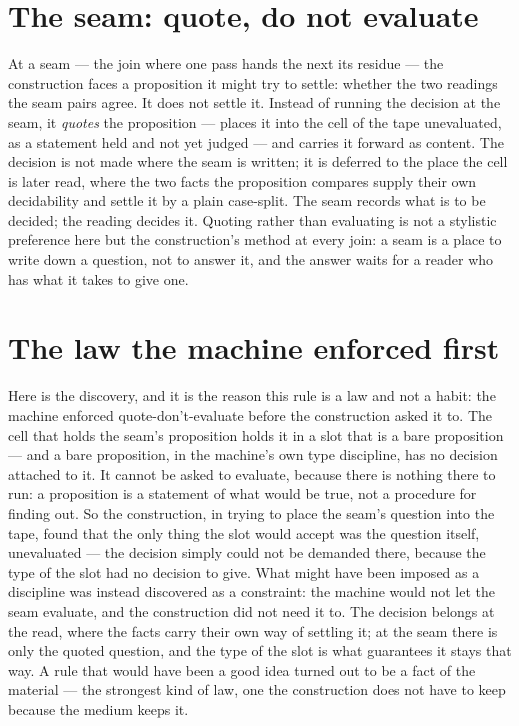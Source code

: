 \section{The seam: quote, do not evaluate}
\label{se:the-seam-quote-not-evaluate}

At a seam --- the join where one pass hands the next its residue --- the construction faces a proposition it
might try to settle: whether the two readings the seam pairs agree. It does not settle it. Instead of
running the decision at the seam, it \emph{quotes} the proposition --- places it into the cell of the tape
unevaluated, as a statement held and not yet judged --- and carries it forward as content. The decision is
not made where the seam is written; it is deferred to the place the cell is later read, where the two facts
the proposition compares supply their own decidability and settle it by a plain case-split. The seam records
what is to be decided; the reading decides it. Quoting rather than evaluating is not a stylistic preference
here but the construction's method at every join: a seam is a place to write down a question, not to answer
it, and the answer waits for a reader who has what it takes to give one.

\section{The law the machine enforced first}
\label{se:law-machine-enforced-first}

Here is the discovery, and it is the reason this rule is a law and not a habit: the machine enforced
quote-don't-evaluate before the construction asked it to. The cell that holds the seam's proposition holds
it in a slot that is a bare proposition --- and a bare proposition, in the machine's own type discipline,
has no decision attached to it. It cannot be asked to evaluate, because there is nothing there to run: a
proposition is a statement of what would be true, not a procedure for finding out. So the construction, in
trying to place the seam's question into the tape, found that the only thing the slot would accept was the
question itself, unevaluated --- the decision simply could not be demanded there, because the type of the
slot had no decision to give. What might have been imposed as a discipline was instead discovered as a
constraint: the machine would not let the seam evaluate, and the construction did not need it to. The
decision belongs at the read, where the facts carry their own way of settling it; at the seam there is only
the quoted question, and the type of the slot is what guarantees it stays that way. A rule that would have
been a good idea turned out to be a fact of the material --- the strongest kind of law, one the construction
does not have to keep because the medium keeps it.

